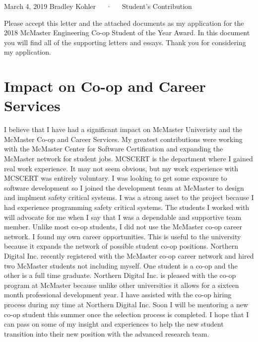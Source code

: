 \documentclass[14pt, a4paper]{awesome-cv}
\begin{document}
\makecvheader[R]

\makecvfooter
  {March 4, 2019}
  {Bradley Kohler~~~·~~~Student's Contribution}
  {}

\makelettertitle

\begin{cvletter}

Please accept this letter and the attached documents as my application for the 2018 McMaster Engineering Co-op Student of the Year Award.  In this document you will find all of the supporting letters and essays.  Thank you for considering my application.

\section*{Impact on Co-op and Career Services}
I believe that I have had a significant impact on McMaster Univeristy and the McMaster Co-op and Career Services.  My greatest contributions were working with the McMaster Center for Software Certification and expanding the McMaster network for student jobs.  MCSCERT is the department where I gained real work experience.  It may not seem obvious, but my work experience with MCSCERT was entirely voluntary.  I was looking to get some exposure to software development so I joined the development team at McMaster to design and implment safety critical systems.  I was a strong asset to the project because I had experience programming safety critical systems.  The students I worked with will advocate for me when I say that I was a dependable and supportive team member.  Unlike most co-op students, I did not use the McMaster co-op career network.  I found my own career opportunities.  This is useful to the university because it expands the network of possible student co-op positions.  Northern Digital Inc. recently registered with the McMaster co-op career network and hired two McMaster students not including myself.  One student is a co-op and the other is a full time graduate.  Northern Digital Inc. is pleased with the co-op program at McMaster because unlike other universities it allows for a sixteen month professional development year.  I have assisted with the co-op hiring process during my time at Northern Digital Inc.  Soon I will be mentoring a new co-op student this summer once the selection process is completed.  I hope that I can pass on some of my insight and experiences to help the new student transition into their new position with the advanced research team. 


\end{cvletter}
\end{document}
